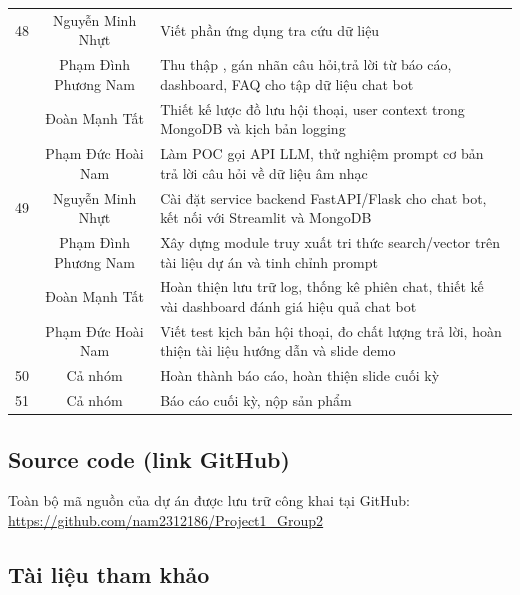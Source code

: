 \documentclass{../hcmut-report}
\begin{document}
\begin{center}
\begin{longtable}{|c|c|p{10cm}|}
48 & Nguyễn Minh Nhựt & Viết phần ứng dụng tra cứu dữ liệu \\
   & Phạm Đình Phương Nam & Thu thập , gán nhãn câu hỏi,trả lời từ báo cáo, dashboard, FAQ cho tập dữ liệu chat bot\\
   & Đoàn Mạnh Tất & Thiết kế lược đồ lưu hội thoại, user context trong MongoDB và kịch bản logging\\
   & Phạm Đức Hoài Nam & Làm POC gọi API LLM, thử nghiệm prompt cơ bản trả lời câu hỏi về dữ liệu âm nhạc\\
\hline
49 & Nguyễn Minh Nhựt & Cài đặt service backend FastAPI/Flask cho chat bot, kết nối với Streamlit và MongoDB \\
   & Phạm Đình Phương Nam & Xây dựng module truy xuất tri thức search/vector trên tài liệu dự án và tinh chỉnh prompt\\
   & Đoàn Mạnh Tất & Hoàn thiện lưu trữ log, thống kê phiên chat, thiết kế vài dashboard đánh giá hiệu quả chat bot \\
   & Phạm Đức Hoài Nam & Viết test kịch bản hội thoại, đo chất lượng trả lời, hoàn thiện tài liệu hướng dẫn và slide demo\\
  

\hline
50 & Cả nhóm & Hoàn thành báo cáo, hoàn thiện slide cuối kỳ \\
\hline
51 & Cả nhóm &   Báo cáo cuối kỳ, nộp sản phẩm \\
\hline
\end{longtable}
\end{center}

\subsection{Source code (link GitHub)}

Toàn bộ mã nguồn của dự án được lưu trữ công khai tại GitHub: 
\url{https://github.com/nam2312186/Project1_Group2}



\subsection{Tài liệu tham khảo}
\end{document}
